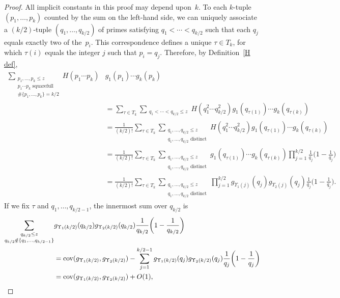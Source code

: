 \documentclass[12pt,reqno]{amsart}
\theoremstyle{definition}
\newcommand{\cov}{\mathop{\rm cov}\nolimits}
\begin{document}
\begin{proof}
All implicit constants in this proof may depend upon~$k$.
To each $k$-tuple $(p_1,\dots,p_k)$ counted by the sum on the left-hand side, we can uniquely associate a $(k/2)$-tuple $(q_1,\dots,q_{k/2})$ of primes satisfying $q_1 < \cdots < q_{k/2}$ such that each $q_j$ equals exactly two of the~$p_i$. This correspondence defines a unique $\tau\in T_k$, for which $\tau(i)$ equals the integer $j$ such that $p_i=q_j$. Therefore, by Definition~\ref{H def},
\begin{align*}
\sum_{\substack{p_1,\dots,p_k \leq z \\ p_1\cdots p_k \text{ squarefull} \\ \#\{p_1,\dots,p_k\} = k/2}} H(p_1\cdots p_k) & g_1(p_1) \cdots g_k(p_k) \\
&= \sum_{\tau\in T_k} \sum_{\substack{q_1 < \cdots < q_{k/2} \leq z}} H(q_1^2 \cdots q_{k/2}^2) g_1(q_{\tau(1)}) \cdots g_k(q_{\tau(k)}) \\
&= \frac1{(k/2)!} \sum_{\tau\in T_k} \sum_{\substack{q_1, \dots, q_{k/2} \leq z \\ q_1,\dots,q_{k/2} \text{ distinct}}} H(q_1^2 \cdots q_{k/2}^2) g_1(q_{\tau(1)}) \cdots g_k(q_{\tau(k)}) \\
&= \frac1{(k/2)!} \sum_{\tau\in T_k} \sum_{\substack{q_1, \dots, q_{k/2} \leq z \\ q_1,\dots,q_{k/2} \text{ distinct}}} g_1(q_{\tau(1)}) \cdots g_k(q_{\tau(k)}) \prod_{j=1}^{k/2} \frac{1}{q_j} \bigg( 1-\frac{1}{q_j} \bigg) \\
&= \frac1{(k/2)!} \sum_{\tau\in T_k} \sum_{\substack{q_1, \dots, q_{k/2} \leq z \\ q_1,\dots,q_{k/2} \text{ distinct}}} \prod_{j=1}^{k/2} g_{\Upsilon_1(j)}(q_j) g_{\Upsilon_2(j)}(q_j) \frac{1}{q_j} \bigg( 1-\frac{1}{q_j} \bigg).
\end{align*}
If we fix $\tau$ and $q_1,\dots,q_{k/2-1}$, the innermost sum over $q_{k/2}$ is
\begin{align*}
\sum_{\substack{q_{k/2} \leq z \\ q_{k/2} \notin \{q_1,\dots,q_{k/2-1}\}}} & g_{\Upsilon_1(k/2)}(q_{k/2}) g_{\Upsilon_2(k/2)}(q_{k/2}) \frac{1}{q_{k/2}} \bigg( 1-\frac{1}{q_{k/2}} \bigg) \\
&= \cov(g_{\Upsilon_1(k/2)},g_{\Upsilon_2(k/2)}) - \sum_{j=1}^{k/2-1} g_{\Upsilon_1(k/2)}(q_j) g_{\Upsilon_2(k/2)}(q_j) \frac{1}{q_j} \bigg( 1-\frac{1}{q_j} \bigg) \\
&= \cov(g_{\Upsilon_1(k/2)},g_{\Upsilon_2(k/2)}) + O(1),
\end{align*}

\end{proof}
\end{document}
